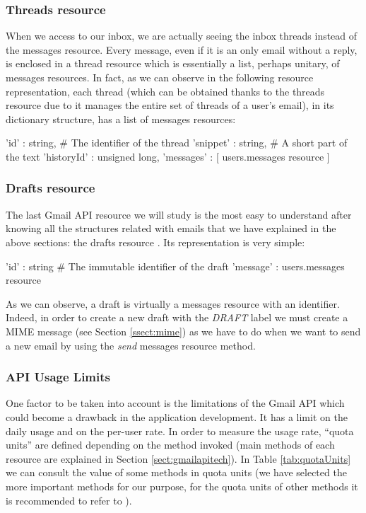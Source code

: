 \subsubsection{Threads resource}\label{sssect:threads}
When we access to our inbox, we are actually seeing the inbox threads instead of the messages resource. Every message, even if it is an only email without a reply, is enclosed in a thread resource \citep[/v1/reference/users/threads]{gmailAPI} which is essentially a list, perhaps unitary, of messages resources. In fact, as we can observe in the following resource representation, each thread (which can be obtained thanks to the threads resource due to it manages the entire set of threads of a user's email), in its dictionary structure, has a list of messages resources:

\begin{python}
	{
		'id' : string, # The identifier of the thread
		'snippet' : string, # A short part of the text
		'historyId' : unsigned long,
		'messages' : [ users.messages resource ]
	}
\end{python}

\subsubsection{Drafts resource}\label{sssect:drafts}
The last Gmail API resource we will study is the most easy to understand after knowing all the structures related with emails that we have explained in the above sections: the drafts resource \citep[/v1/reference/users/drafts]{gmailAPI}. Its representation is very simple:

\begin{python}
	{
		'id' : string # The immutable identifier of the draft
		'message' : users.messages resource
	}
\end{python}

As we can observe, a draft is virtually a messages resource with an identifier. Indeed, in order to create a new draft with the \textit{DRAFT} label we must create a MIME message (see Section \ref{ssect:mime}) as we have to do when we want to send a new email by using the \textit{send} messages resource method.

\subsubsection{API Usage Limits} \label{sssect:apilimits}
One factor to be taken into account is the limitations of the Gmail API \citep[/v1/reference/quota]{gmailAPI} which could become a drawback in the application development. It has a limit on the daily usage and on the per-user rate. In order to measure the usage rate, ``quota units'' are defined depending on the method invoked (main methods of each resource are explained in Section \ref{sect:gmailapitech}). In Table \ref{tab:quotaUnits} we can consult the value of some methods in quota units (we have selected the more important methods for our purpose, for the quota units of other methods it is recommended to refer to \cite[/v1/reference/quota]{gmailAPI}).

